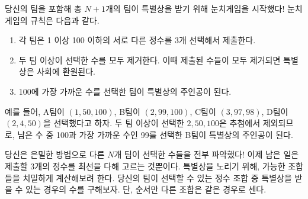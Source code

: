 당신의 팀을 포함해 총 $N+1$개의 팀이 특별상을 받기 위해 눈치게임을 시작했다! 눈치게임의 규칙은 다음과 같다.

\begin{enumerate}
    \item 각 팀은 1 이상 100 이하의 서로 다른 정수를 3개 선택해서 제출한다.
    \item 두 팀 이상이 선택한 수를 모두 제거한다. 이때 제출된 수들이 모두 제거되면 특별상은 사회에 환원된다.
    \item 100에 가장 가까운 수를 선택한 팀이 특별상의 주인공이 된다.
\end{enumerate}

예를 들어, A팀이 $(1, 50, 100)$, B팀이 $(2, 99, 100)$, C팀이 $(3, 97, 98)$, D팀이 $(2, 4, 50)$을 선택했다고 하자. 두 팀 이상이 선택한 $2, 50, 100$은 추첨에서 제외되므로, 남은 수 중 100과 가장 가까운 수인 99를 선택한 B팀이 특별상의 주인공이 된다.

당신은 은밀한 방법으로 다른 $N$개 팀이 선택한 수들을 전부 파악했다! 이제 남은 일은 제출할 3개의 정수를 최선을 다해 고르는 것뿐이다. 특별상을 노리기 위해, 가능한 조합들을 치밀하게 계산해보려 한다. 당신의 팀이 선택할 수 있는 정수 조합 중 특별상을 받을 수 있는 경우의 수를 구해보자. 단, 순서만 다른 조합은 같은 경우로 센다.